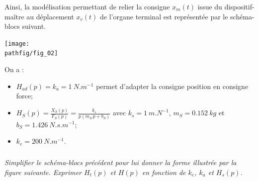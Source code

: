 \documentclass[10pt,fleqn]{article} %
\begin{document}
Ainsi, la modélisation permettant de relier la consigne $x_m(t)$ issue du dispositif-maître au déplacement
$x_v(t)$ de l'organe terminal est représentée par le schéma-blocs suivant.%

\begin{center}
\texttt{[image: \\pathfig/fig\_02]}
%
%

\end{center}

On a :
\begin{itemize}
\item $H_{ad}(p) = k_a = \SI{1}{N.m^{-1}}$ permet d'adapter la consigne position en consigne force;
\item  $H_S(p) = \frac{X_S(p)}{F_S(p)}= \frac{k_s}{p\left( m_S \, p + b_S\right) }$ avec $k_s = \SI{1}{m.N^{-1}}$, $m_S = \SI{0,152}{kg}$ et $b_S = \SI{1,426}{N.s.m^{-1}}$;
\item $k_e = \SI{200}{N.m^{-1}}$.
\end{itemize}



\subparagraph{}\textit{Simplifier le schéma-blocs précédent pour lui donner la forme illustrée par la figure suivante. 
Exprimer $H_t(p)$ et $H(p)$ en fonction de $k_e$, $k_a$ et $H_s(p)$.
}
\end{document}
